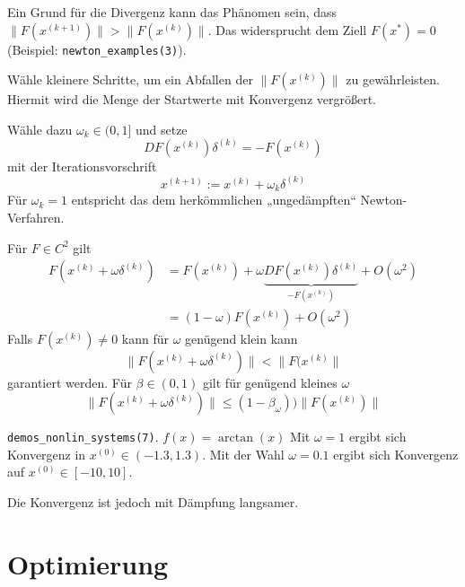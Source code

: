\documentclass[11pt]{scrbook}
\begin{document}
Ein Grund für die Divergenz kann das Phänomen sein, dass $\|F(x^{(k+1)})\| > \|F(x^{(k)})\|$.
Das widersprucht dem Ziell $F(x^*) = 0$ (Beispiel: \verb|newton_examples(3)|).

\begin{seg}
	Wähle kleinere Schritte, um ein Abfallen der $\|F(x^{(k)})\|$ zu gewährleisten. 
	Hiermit wird die Menge der Startwerte mit Konvergenz vergrößert.

	Wähle dazu $\omega_k \in (0,1]$ und setze
	\[
		DF(x^{(k)}) \delta^{(k)} = - F(x^{(k)})
	\]
	mit der Iterationsvorschrift
	\[
		x^{(k+1)} := x^{(k)} + \omega_k \delta^{(k)}
	\]
	Für $\omega_k = 1$ entspricht das dem herkömmlichen „ungedämpften“ Newton-Verfahren.

	Für $F \in C^2$ gilt
	\begin{align*}
		F(x^{(k)} + \omega \delta^{(k)}) &= F(x^{(k)}) + \omega \underbrace{DF(x^{(k)})\delta^{(k)}}_{-F(x^{(k)})} + O(\omega^2) \\
		&= (1 - \omega)F(x^{(k)}) + O(\omega^2)
	\end{align*}
	Falls $F(x^{(k)}) \neq 0$ kann für $\omega$ genügend klein kann
	\[
		\|F(x^{(k)} + \omega \delta^{(k)}) \| < \|F(x^{(k)}\|
	\]
	garantiert werden.
	Für $\beta \in (0,1)$ gilt für genügend kleines $\omega$
	\[
		\|F(x^{(k)} + \omega \delta^{(k)})\|  \le (1 - \beta_\omega)) \|F(x^{(k)})\|
	\]
	\begin{ex*}
		\verb|demos_nonlin_systems(7)|.
		$f(x) = \arctan(x)$
		Mit $\omega = 1$ ergibt sich Konvergenz in $x^{(0)} \in (-1.3, 1.3)$.
		Mit der Wahl $\omega = 0.1$ ergibt sich Konvergenz auf $x^{(0)} \in [-10, 10]$.

		Die Konvergenz ist jedoch mit Dämpfung langsamer.
	\end{ex*}
\end{seg}



\chapter{Optimierung}
\end{document}
